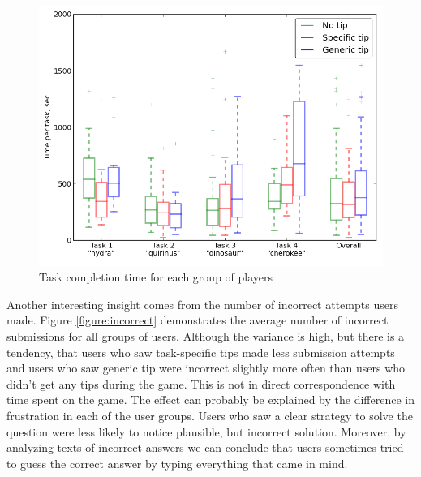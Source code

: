 \documentclass{sig-alternate}
\begin{document}
\begin{figure}[ht]
\centering
\includegraphics[scale=0.4]{img/time_per_task}
\caption{Task completion time for each group of players}
\label{figure:task_time}
\end{figure}

Another interesting insight comes from the number of incorrect attempts users made. Figure \ref{figure:incorrect} demonstrates the average number of incorrect submissions for all groups of users. Although the variance is high, but there is a tendency, that users who saw task-specific tips made less submission attempts and users who saw generic tip were incorrect slightly more often than users who didn't get any tips during the game. 
This is not in direct correspondence with time spent on the game. The effect can probably be explained by the difference in frustration in each of the user groups. Users who saw a clear strategy to solve the question were less likely to notice plausible, but incorrect solution.
Moreover, by analyzing texts of incorrect answers we can conclude that users sometimes tried to guess the correct answer by typing everything that came in mind.
\end{document}
